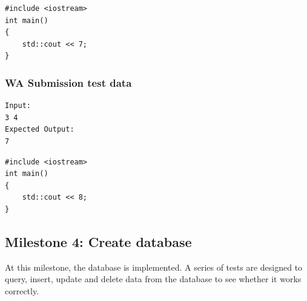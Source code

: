 \documentclass[a4paper]{report}
\begin{document}
\begin{verbatim}
#include <iostream>
int main()
{
    std::cout << 7;
}
\end{verbatim}

\subsubsection{WA Submission test data}

\begin{verbatim}
Input:
3 4
Expected Output:
7 
\end{verbatim}

\begin{verbatim}
#include <iostream>
int main()
{
    std::cout << 8;
}
\end{verbatim}

\subsection{Milestone 4: Create database}

At this milestone, the database is implemented. A series of tests are designed to query, insert, update and delete data from the database to see whether it works correctly.
\end{document}
